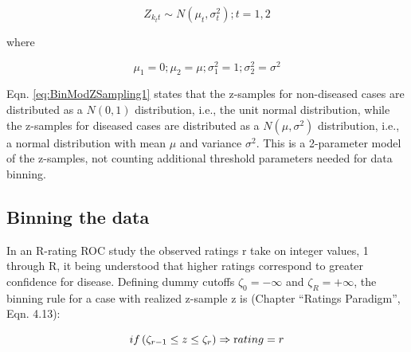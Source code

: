 \documentclass[
]{book}
\begin{document}
\begin{equation} 
Z_{k_tt}\sim N\left ( \mu_t,\sigma_{t}^{2} \right );t=1,2
\label{eq:BinModZSampling1}
\end{equation}

where

\begin{equation} 
\mu_1=0;\mu_2=\mu;\sigma_{1}^{2}=1;\sigma_{2}^{2}=\sigma^{2}
\label{eq:BinModZSampling2}
\end{equation}

Eqn. \eqref{eq:BinModZSampling1} states that the z-samples for non-diseased cases are distributed as a \(N(0,1)\) distribution, i.e., the unit normal distribution, while the z-samples for diseased cases are distributed as a \(N(\mu,\sigma^2)\) distribution, i.e., a normal distribution with mean \(\mu\) and variance \(\sigma^2\). This is a 2-parameter model of the z-samples, not counting additional threshold parameters needed for data binning.

\hypertarget{binning-the-data}{%
\subsection{Binning the data}\label{binning-the-data}}

In an R-rating ROC study the observed ratings r take on integer values, 1 through R, it being understood that higher ratings correspond to greater confidence for disease. Defining dummy cutoffs \(\zeta_0 = -\infty\) and \(\zeta_R = +\infty\), the binning rule for a case with realized z-sample z is (Chapter ``Ratings Paradigm'', Eqn. 4.13):

\begin{equation} 
if \left (\zeta_{r-1} \le z \le \zeta_r  \right )\Rightarrow \text rating = r
\label{eq:BinModZBinning}
\end{equation}
\end{document}
